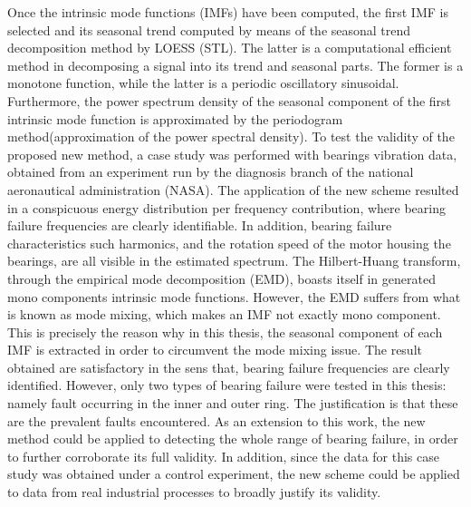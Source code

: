 \documentclass[../Main/thesis.tex]{subfiles}
\begin{document}
	\justify
	Once the intrinsic mode functions (IMFs) have been computed, the first IMF is selected and its seasonal trend computed by means of the seasonal trend decomposition method by LOESS (STL). The latter is a computational efficient method in decomposing a signal into its trend and seasonal parts. The former is a monotone function, while the latter is a periodic oscillatory sinusoidal. Furthermore, the power spectrum density of the seasonal component of the first intrinsic mode function is approximated by the periodogram method(approximation of the power spectral density).
	\justify
	To test the validity of the proposed new method, a case study was performed with bearings vibration data, obtained from an experiment run by the diagnosis branch of the national aeronautical administration (NASA). The application of the new scheme resulted in a conspicuous energy distribution per frequency contribution, where bearing failure frequencies are clearly identifiable. In addition, bearing failure characteristics such harmonics, and the rotation speed of the motor housing the bearings, are all visible in the estimated spectrum.
	\justify
	The Hilbert-Huang transform, through the empirical mode decomposition (EMD), boasts itself in generated mono components intrinsic mode functions. However, the EMD suffers from what is known as mode mixing, which makes an IMF not exactly mono component. This is precisely the reason why in this thesis, the seasonal component of each IMF is extracted in order to circumvent the mode mixing issue.
	\justify
	The result obtained are satisfactory in the sens that, bearing failure frequencies are clearly identified. However, only two types of bearing failure were tested in this thesis: namely fault occurring in the inner and outer ring. The justification is that these are the prevalent faults encountered. As an extension to this work, the new method could be applied to detecting the whole range of bearing failure, in order to further corroborate its full validity. In addition, since the data for this case study was obtained under a control experiment, the new scheme could be applied to data from real industrial processes to broadly justify its validity.

	
\end{document}
